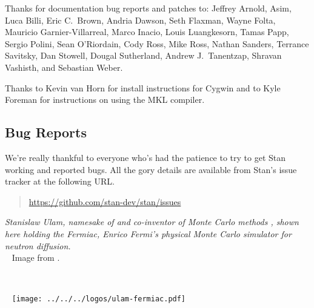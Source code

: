 Thanks for documentation bug reports and patches to: Jeffrey Arnold,
Asim, Luca Billi, Eric C.~Brown, Andria Dawson, Seth Flaxman, Wayne
Folta, Mauricio Garnier-Villarreal, Marco Inacio, Louis Luangkesorn,
Tamas Papp, Sergio Polini, Sean O'Riordain, Cody Ross, Mike Ross,
Nathan Sanders, Terrance Savitsky, Dan Stowell, Dougal Sutherland,
Andrew J.~Tanentzap, Shravan Vashisth, and Sebastian Weber.

Thanks to Kevin van Horn for install instructions for Cygwin and to
Kyle Foreman for instructions on using the MKL compiler.


\subsection*{Bug Reports}

We're really thankful to everyone who's had the patience to try
to get Stan working and reported bugs.  All the gory details are
available from Stan's issue tracker at the following URL.
%
\begin{quote}
\url{https://github.com/stan-dev/stan/issues}
\end{quote}




\vfill
\begin{center}
\hfill
\begin{minipage}[b]{2in}
  \footnotesize {\it Stanislaw Ulam, namesake of \Stan and co-inventor
    of Monte Carlo methods \citep{MetropolisUlam:1949}, shown here
    holding the Fermiac, Enrico Fermi's physical Monte Carlo simulator
    for neutron diffusion.}
  \\[3pt] \mbox{ } \hfill
  {\scriptsize Image from \citep{Giesler:2000}.}
\end{minipage} \ \ \ \ \ 
\begin{minipage}[b]{1.5in} \mbox{ } \hfill
  \texttt{[image: ../../../logos/ulam-fermiac.pdf]}
\end{minipage} 
\end{center}

